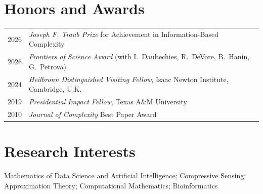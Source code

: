 \documentclass[11pt]{article}
\begin{document}
\section{Honors and Awards}

\begin{tabular}{ll}
2026 & {\sl Joseph F. Traub Prize} for Achievement in Information-Based Complexity\\
2026 & {\sl Frontiers of Science Award} (with 
I.~Daubechies, R.~DeVore, B.~Hanin, G.~Petrova)\\
2024 & %
{\sl Heilbronn Distinguished Visiting Fellow}, Isaac Newton Institute, Cambridge, U.K.\\
2019 & %
{\sl Presidential Impact Fellow}, Texas A\&M University\\
2010 & {\sl Journal of Complexity} Best Paper Award\\
\end{tabular}

\section{Research Interests}

Mathematics of Data Science and Artificial Intelligence;
Compressive Sensing;
Approximation Theory; 
Computational Mathematics;
Bioinformatics 


 
\end{document}
